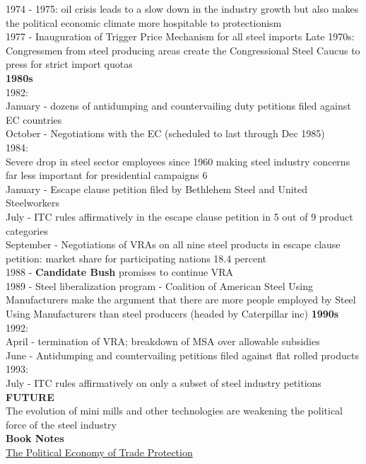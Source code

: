 \documentclass[10pt]{article}
\begin{document}
1974 - 1975: oil crisis leads to a slow down in the industry growth but also makes the political economic climate more hospitable to protectionism\\  
1977 - Inauguration of Trigger Price Mechanism for all steel imports
Late 1970s: Congressmen from steel producing areas create the Congressional Steel Caucus to press for strict import quotas\\
\normalsize\textbf{1980s}\\
1982:\\ 
January - dozens of antidumping and countervailing duty petitions filed against EC countries\\
October - Negotiations with the EC (scheduled to last through Dec 1985)\\
1984:\\
Severe drop in steel sector employees since 1960 making steel industry concerns far less important for presidential campaigns 6\\
January - Escape clause petition filed by Bethlehem Steel and United Steelworkers\\ 
July - ITC rules affirmatively in the escape clause petition in 5 out of 9 product categories\\
September - Negotiations of VRAs on all nine steel products in escape clause petition: market share for participating nations 18.4 percent \\
1988 - \textbf{Candidate Bush} promises to continue VRA\\
1989 - Steel liberalization program - Coalition of American Steel Using Manufacturers make the argument that there are more people employed by Steel Using Manufacturers than steel producers (headed by Caterpillar inc) 
\normalsize\textbf{1990s}\\ 
1992:\\
April - termination of VRA; breakdown of MSA over allowable subsidies\\
June - Antidumping and countervailing petitions filed against flat rolled products\\
1993:\\
July - ITC rules affirmatively on only a subset of steel industry petitions\\
\normalsize\textbf{FUTURE}\\ 
The evolution of mini mills and other technologies are weakening the political force of the steel industry\\
\large\textbf{Book Notes}\\
\normalsize\underline{The Political Economy of Trade Protection}\\
\end{document}
